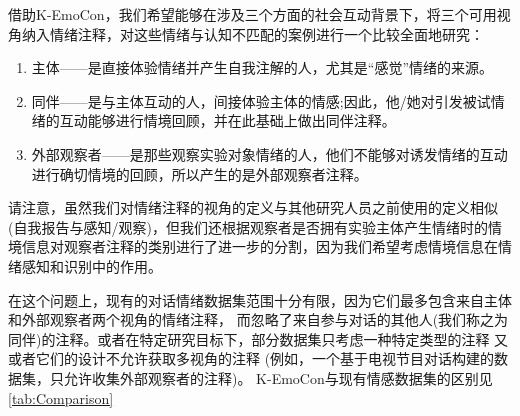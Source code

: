 借助K-EmoCon，我们希望能够在涉及三个方面的社会互动背景下，将三个可用视角纳入情绪注释，对这些情绪与认知不匹配的案例进行一个比较全面地研究：
\begin{enumerate}
    \item 主体——是直接体验情绪并产生自我注解的人，尤其是“感觉”情绪的来源。
    \item 同伴——是与主体互动的人，间接体验主体的情感;因此，他/她对引发被试情绪的互动能够进行情境回顾，并在此基础上做出同伴注释。
    \item 外部观察者——是那些观察实验对象情绪的人，他们不能够对诱发情绪的互动进行确切情境的回顾，所以产生的是外部观察者注释。
    \end{enumerate}



请注意，虽然我们对情绪注释的视角的定义与其他研究人员之前使用的定义相似(自我报告与感知/观察)，但我们还根据观察者是否拥有实验主体产生情绪时的情境信息对观察者注释的类别进行了进一步的分割，因为我们希望考虑情境信息在情绪感知和识别中的作用。

在这个问题上，现有的对话情绪数据集范围十分有限，因为它们最多包含来自主体和外部观察者两个视角的情绪注释，
而忽略了来自参与对话的其他人(我们称之为同伴)的注释。或者在特定研究目标下，部分数据集只考虑一种特定类型的注释
又或者它们的设计不允许获取多视角的注释 (例如，一个基于电视节目对话构建的数据集，只允许收集外部观察者的注释)。
K-EmoCon与现有情感数据集的区别见\autoref{tab:Comparison}

